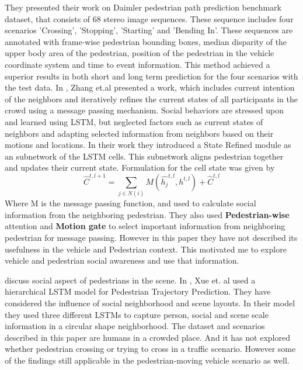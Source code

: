 They presented their work on Daimler pedestrian path prediction benchmark dataset, that consists of 68 stereo image sequences. These sequence includes four scenarios 'Crossing', 'Stopping', 'Starting' and 'Bending In'. These sequences are annotated with frame-wise pedestrian bounding boxes, median disparity of the upper body area of the pedestrian, position of the pedestrian in the vehicle coordinate system and time to event information. This method achieved a superior results in both short and long term prediction for the four scenarios with the test data.
In \cite{zhang2019sr}, Zhang et.al presented a work, which includes current intention of the neighbors and iteratively refines the current states of all participants in the crowd using a message passing mechanism. Social behaviors are stressed upon and learned using LSTM, but \cite{zhang2019sr} neglected factors such as current states of neighbors and adapting selected information from neighbors based on their motions and locations. In their work they introduced a State Refined module as an subnetwork of the LSTM cells. This subnetwork aligns pedestrian together and updates their current state. Formulation for the cell state was given by 
\begin{equation}
\hat{C}^{t, l+1}= \sum_{j\in N(i)}M(\hat{h_j}^{t, l}, {h}^{t, l}) + \hat{C}^{t, l}
\end{equation}
Where M is the message passing function, and used to calculate social information from the neighboring pedestrian. They also used \textbf{Pedestrian-wise }attention and \textbf{Motion gate} to select important information from neighboring pedestrian for message passing. However in this paper they have not described its usefulness in the vehicle and Pedestrian context. This motivated me to explore vehicle and pedestrian social awareness and use that information.


\cite{alahi2016social, xue2018ss} discuss social aspect of pedestrians in the scene. In \cite{xue2018ss}, Xue et. al used a hierarchical LSTM model for Pedestrian Trajectory Prediction. They have considered the influence of social neighborhood and scene layouts. In their model they used three different LSTMs to capture person, social and scene scale information in a circular shape neighborhood. The dataset and scenarios described in this paper are humans in a crowded place. And it has not explored whether pedestrian crossing or trying to cross in a traffic scenario. However some of the findings still applicable in the pedestrian-moving vehicle scenario as well.


